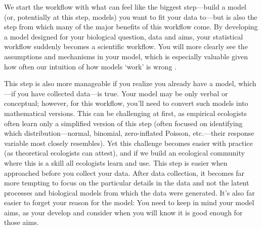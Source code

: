 \documentclass[11pt]{article}
\begin{document}
We start the workflow with what can feel like the biggest step---build a model (or, potentially at this step, models) you want to fit your data to---but is also the step from which many of the major benefits of this workflow come. By developing a model designed for your biological question, data and aims, your statistical workflow suddenly becomes a scientific workflow. You will more clearly see the assumptions and mechanisms in your model, which is especially valuable given how often our intuition of how models `work' is wrong \citep{kokko2005useful}.  

This step is also more manageable if you realize you already have a model, which---if you have collected data---is true. Your model may be only verbal or conceptual; however, for this workflow, you’ll need to convert such models into mathematical versions. This can be challenging at first, as empirical ecologists often learn only a simplified version of this step (often focused on identifying which distribution---normal, binomial, zero-inflated Poisson, etc.---their response variable most closely resembles). Yet this challenge becomes easier with practice (as theoretical ecologists can attest), and if we build an ecological community where this is a skill all ecologists learn and use. This step is easier when approached before you collect your data. After data collection, it becomes far more tempting to focus on the particular details in the data and not the latent processes and biological models from which the data were generated. It's also far easier to forget your reason for the model: You  need to keep in mind your model aims, as your develop and consider when you will know it is good enough for those aims. 
\end{document}
